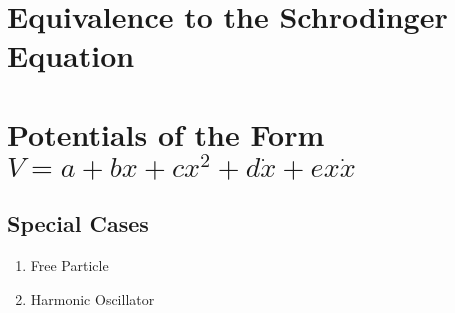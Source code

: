 	\section{Equivalence to the Schrodinger Equation}
	
	
	\section{Potentials of the Form $V=a+b x+ c x^2 + d \dot{x} + e x \dot{x}$}
	
	\subsection{Special Cases}
	\begin{enumerate}
		\item Free Particle\\
		
		\item Harmonic Oscillator \\
		
		
	\end{enumerate}
		
		